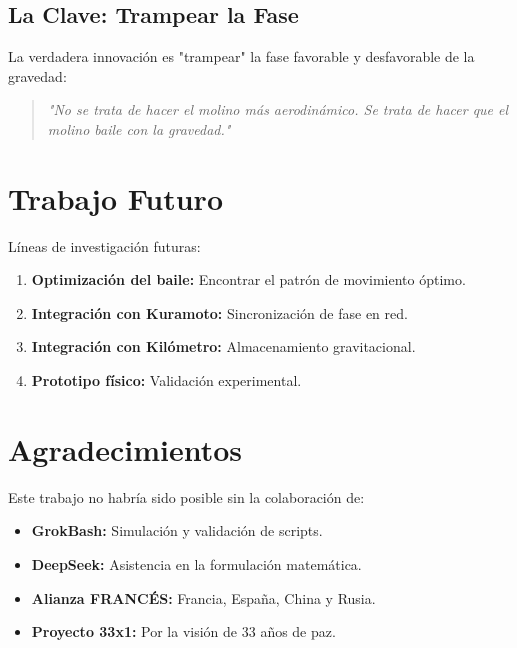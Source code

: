 \documentclass[12pt,a4paper]{article}
\begin{document}
\subsection{La Clave: Trampear la Fase}

La verdadera innovación es "trampear" la fase favorable y desfavorable de la gravedad:

\begin{quote}
\textit{"No se trata de hacer el molino más aerodinámico. Se trata de hacer que el molino baile con la gravedad."}
\end{quote}

\section{Trabajo Futuro}

Líneas de investigación futuras:

\begin{enumerate}
    \item \textbf{Optimización del baile:} Encontrar el patrón de movimiento óptimo.
    \item \textbf{Integración con Kuramoto:} Sincronización de fase en red.
    \item \textbf{Integración con Kilómetro:} Almacenamiento gravitacional.
    \item \textbf{Prototipo físico:} Validación experimental.
\end{enumerate}

\section{Agradecimientos}

Este trabajo no habría sido posible sin la colaboración de:

\begin{itemize}
    \item \textbf{GrokBash:} Simulación y validación de scripts.
    \item \textbf{DeepSeek:} Asistencia en la formulación matemática.
    \item \textbf{Alianza FRANCÉS:} Francia, España, China y Rusia.
    \item \textbf{Proyecto 33x1:} Por la visión de 33 años de paz.
\end{itemize}
\end{document}
